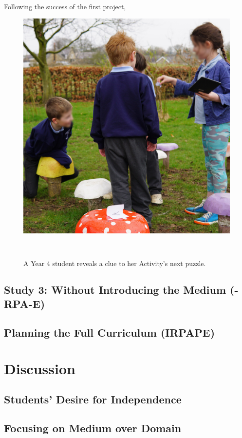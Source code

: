 \documentclass[,hyphens]{sigchi}
\begin{document}
Following the success of the first project, 

\begin{figure}
\centering
  \includegraphics[width=0.8\columnwidth]{figures/mushrooms}
  \caption{A Year 4 student reveals a clue to her Activity's next puzzle. }~\label{fig:Mushrooms}
\end{figure}

\subsection{Study 3: Without Introducing the Medium (-RPA-E)}

\subsection{Planning the Full Curriculum (IRPAPE)}

\section{Discussion}

\subsection{Students' Desire for Independence}

\subsection{Focusing on Medium over Domain}
\end{document}

